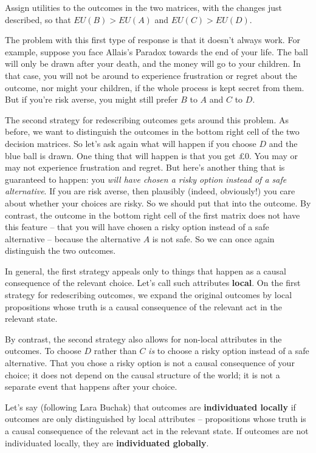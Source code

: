 \begin{exercise}{1}
  Assign utilities to the outcomes in the two matrices, with the
  changes just described, so that $EU(B) > EU(A)$ and $EU(C) >
  EU(D)$. 
\end{exercise}

The problem with this first type of response is that it doesn't always
work. For example, suppose you face Allais's Paradox towards the end
of your life. The ball will only be drawn after your death, and the
money will go to your children. In that case, you will not be around
to experience frustration or regret about the outcome, nor might your
children, if the whole process is kept secret from them. But if you're
risk averse, you might still prefer $B$ to $A$ and $C$ to
$D$.

The second strategy for redescribing outcomes gets around this
problem. As before, we want to distinguish the outcomes in the bottom
right cell of the two decision matrices. So let's ask again what will
happen if you choose $D$ and the blue ball is drawn. One thing that
will happen is that you get £0. You may or may not experience
frustration and regret. But here's another thing that is guaranteed to
happen: you \emph{will have chosen a risky option instead of a safe
  alternative}. If you are risk averse, then plausibly (indeed,
obviously!) you care about whether your choices are risky. So we
should put that into the outcome. By contrast, the outcome in the
bottom right cell of the first matrix does not have this feature --
that you will have chosen a risky option instead of a safe alternative
-- because the alternative $A$ is not safe.  So we can once again
distinguish the two outcomes.

In general, the first strategy appeals only  to things that happen as a
causal consequence of the relevant choice. Let's call such attributes
\textbf{local}. On the first strategy for redescribing outcomes, we expand the
original outcomes by local propositions whose truth is a causal consequence of
the relevant act in the relevant state.

By contrast, the second strategy also allows for non-local attributes
in the outcomes. To choose $D$ rather than $C$ \emph{is} to choose a
risky option instead of a safe alternative. That you chose a risky
option is not a causal consequence of your choice; it does not depend
on the causal structure of the world; it is not a separate event that
happens after your choice.

Let's say (following Lara Buchak) that outcomes are
\textbf{individuated locally} if outcomes are only distinguished by
local attributes -- propositions whose truth is a causal consequence of the relevant act in the
relevant state. If outcomes are not individuated locally, they are
\textbf{individuated globally}.

